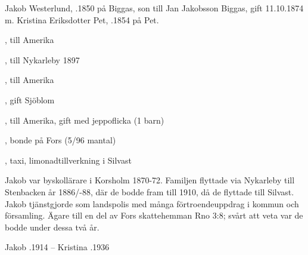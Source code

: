 Jakob Westerlund, .1850 på Biggas, son till Jan Jakobsson Biggas, gift 11.10.1874 m. Kristina Eriksdotter Pet, .1854 på Pet.
\begin{jhchildren}
  \item {}, till Amerika
  \item {}, till Nykarleby 1897
  \item {}, till Amerika
  \item {}, gift Sjöblom
  \item {}, till Amerika, gift med jeppoflicka (1 barn)
  \item {}, bonde på Fors (5/96 mantal)
  \item {}
  \item {}
  \item {}
  \item {}, taxi, limonadtillverkning i Silvast
\end{jhchildren}

Jakob var byskollärare i Korsholm 1870-72. Familjen flyttade via Nykarleby till Stenbacken år 1886/-88, där de bodde fram till 1910, då de flyttade till Silvast. Jakob tjänstgjorde som landspolis med många förtroendeuppdrag i kommun och församling. Ägare till en del av Fors skattehemman Rno 3:8; svårt att veta var de bodde under dessa två år.

Jakob .1914  -- 	Kristina .1936
